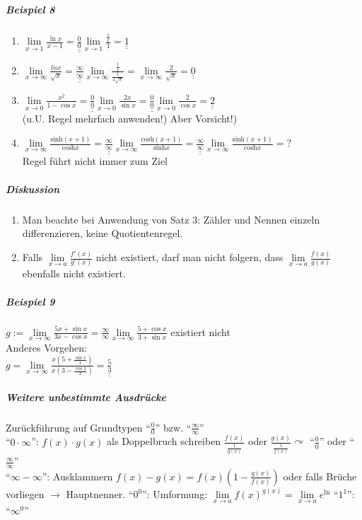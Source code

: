 \documentclass[a4paper]{scrartcl}
\begin{document}
\subparagraph{Beispiel 8}
\begin{enumerate}
\item $\lim\limits_{x \to 1} \frac{\ln{x}}{x-1} = \underline{\underline{\frac{0}{0}}} \lim\limits_{x \to 1} \frac{\frac{1}{x}}{1} = \underline{\underline{1}}$
\item $\lim\limits_{x \to \infty} \frac{ln{x}}{\sqrt{x}} = \underline{\underline{\frac{\infty}{\infty}}} \lim\limits_{x\to \infty} \frac{\frac{1}{x}}{\frac{1}{2\sqrt{x}}} = \lim\limits_{x \to \infty} \frac{2}{\sqrt{x}} = \underline{\underline{0}}$
\item $\lim\limits_{x \to 0} \frac{x^2}{1-\cos{x}} = \underline{\underline{\frac{0}{0}}} \lim\limits_{x \to 0} \frac{2x}{\sin{x}} = \underline{\underline{\frac{0}{0}}} \lim\limits_{x \to 0} \frac{2}{\cos{x}} = \underline{\underline{2}}$\\
(u.U. Regel mehrfach anwenden!) Aber Vorsicht!)
\item $\lim\limits_{x \to \infty} \frac{\text{sinh} (x+1)}{\text{cosh} x} = \underline{\underline{\frac{\infty}{\infty}}} \lim\limits_{x \to \infty} \frac{\text{cosh}(x+1)}{\text{sinh} x} = \underline{\underline{\frac{\infty}{\infty}}} \lim\limits_{x \to \infty} \frac{\text{sinh} (x+1)}{\text{cosh} x} = ?$\\
Regel führt nicht immer zum Ziel
\end{enumerate}

\subparagraph{Diskussion}
\begin{enumerate}
\item Man beachte bei Anwendung von Satz 3: Zähler und Nennen einzeln differenzieren, keine Quotientenregel.
\item Falls $\lim\limits_{x \to a} \frac{f'(x)}{g'(x)}$ nicht existiert, darf man nicht folgern, dass $\lim\limits_{x \to a} \frac{f(x)}{g(x)}$ ebenfalls nicht existiert.
\end{enumerate}

\subparagraph{Beispiel 9} $g:= \lim\limits_{x \to \infty} \frac{5x + \sin{x}}{3x-\cos{x}} = \frac{\infty}{\infty} \lim\limits_{x \to \infty} \frac{5+\cos{x}}{3+ \sin{x}}$ existiert nicht\\
Anderes Vorgehen:\\
$g=\lim\limits_{x\to \infty} \frac{x(5+\frac{\sin{x}}{x})}{x(3- \frac{\cos{x}}{x})} = \underline{\underline{\frac{5}{3}}}$

\subparagraph{Weitere unbestimmte Ausdrücke} Zurückführung auf Grundtypen "`$\frac{0}{0}$"' bzw. "`$\frac{\infty}{\infty}$"'\\
"`$0 \cdot \infty$"': $f(x) \cdot g(x)$ als Doppelbruch schreiben $\frac{f(x)}{\frac{1}{g(x)}}$ oder $\frac{g(x)}{\frac{1}{f(x)}} \curvearrowright$ "`$\frac{0}{0}$"' oder "`$\frac{\infty}{\infty}$"'\\
"`$\infty-\infty$"': Ausklammern $f(x)-g(x) = f(x) (1-\frac{g(x)}{f(x)})$ oder falls Brüche vorliegen $\to$ Hauptnenner.
"`$0^0$"': Umformung: $\lim\limits_{x \to a} f(x)^{g(x)} = \lim\limits_{x \to a} e^{\ln}$ %
"`$1^1$"':
"`$\infty^0$"' 
\end{document}
